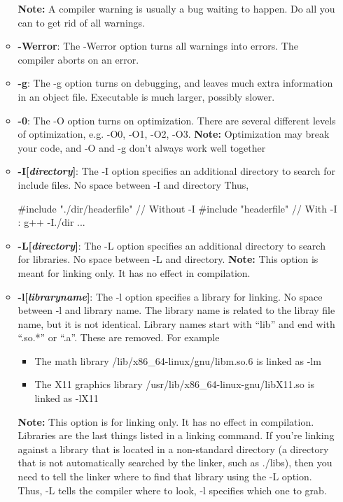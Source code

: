 \documentclass{report}
\begin{document}
\begin{itemize}
\begin{itemize}
                    \bigbreak \noindent 
                    \textbf{Note:} A compiler warning is usually a bug waiting to happen. Do all you can to get rid of all warnings.
                \item \textbf{-Werror}: The -Werror option turns all warnings into errors. The compiler aborts on an error.
                \item \textbf{-g}: The -g option turns on debugging, and leaves much extra information in an object file. Executable is much larger, possibly slower.
                \item \textbf{-0}: The -O option turns on optimization. There are several different levels of optimization, e.g. -O0, -O1, -O2, -O3. 
                    \bigbreak \noindent 
                    \textbf{Note:} Optimization may break your code, and -O and -g don’t always work well together
                \item \textbf{-I[\textit{directory}]}: The -I option specifies an additional directory to search for include files. No space between -I and directory
                    \bigbreak \noindent 
                    Thus, 
                    \begin{cppcode}
                    #include "./dir/headerfile" // Without -I
                    #include "headerfile" // With -I : g++ -I./dir ...
                    \end{cppcode}
                \item \textbf{-L[\textit{directory}]}: The -L option specifies an additional directory to search for libraries. No space between -L and directory.
                    \bigbreak \noindent 
                    \textbf{Note:} This option is meant for linking only. It has no effect in compilation.
                \item \textbf{-l[\textit{libraryname}]}: The -l option specifies a library for linking. No space between -l and library name. The library name is related to the libray file name, but it is not identical. Library names start with “lib” and end with “.so.*” or “.a”. These are removed. For example
                    \begin{itemize}
                        \item The math library /lib/x86\_64-linux/gnu/libm.so.6 is linked as -lm
                        \item The X11 graphics library /usr/lib/x86\_64-linux-gnu/libX11.so is linked as -lX11
                    \end{itemize}
                    \bigbreak \noindent 
                    \textbf{Note:} This option is for linking only. It has no effect in compilation.  Libraries are the last things listed in a linking command.
                    \bigbreak \noindent 
                    If you're linking against a library that is located in a non-standard directory (a directory that is not automatically searched by the linker, such as ./libs), then you need to tell the linker where to find that library using the -L option. Thus, -L tells the compiler  where to look, -l specifies which one to grab.


\end{itemize}
\end{itemize}
\end{document}
